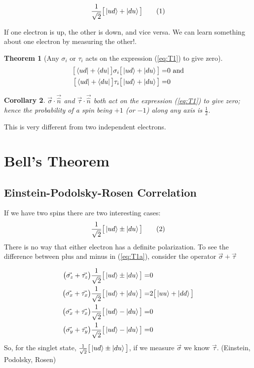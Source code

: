 \documentclass[]{article}
\newcommand\numberthis{\addtocounter{equation}{1}\tag{\theequation}}
\newtheorem{thm}{Theorem}
\newtheorem{cor}[thm]{Corollary}
\begin{document}
\begin{align*}
	\frac{1}{\sqrt{2}}\big[\ket{ud}+\ket{du}\big] \numberthis \label{eq:T1}
\end{align*}

If one electron is up, the other is down, and vice versa. We can learn something about one electron by measuring the other!.

\begin{thm}[Any $\sigma_i$ or $\tau_i$ acts on the expression (\ref{eq:T1}) to give zero]
	\begin{align*}
		\big[\bra{ud}+\bra{du}\big]\sigma_i\big[\ket{ud}+\ket{du}\big]=&0 \text{ and}\\
		\big[\bra{ud}+\bra{du}\big]\tau_i\big[\ket{ud}+\ket{du}\big]=&0
	\end{align*}
\end{thm}

\begin{cor}
	$\vec{\sigma}\cdot\vec{\hat{n}}$ and $\vec{\tau}\cdot\vec{\hat{n}}$ both  act on the expression (\ref{eq:T1}) to give zero; hence the probability of a spin being $+1$ (or $-1$) along any axis is $\frac{1}{2}$.
\end{cor}

This is very different from two independent electrons.

\section{Bell's Theorem}

\subsection{Einstein-Podolsky-Rosen Correlation}

If we have two spins there are two interesting cases:
\begin{align*}
	\frac{1}{\sqrt{2}}\big[\ket{ud}\pm\ket{du}\big] \numberthis \label{eq:T1a}
\end{align*}
There is no way that either electron has a definite polarization. To see the difference between plus and minus in (\ref{eq:T1a}), consider the operator $\vec{\sigma} + \vec{\tau}$

\begin{align*}
\big(\vec{\sigma_z} + \vec{\tau_z}\big)\frac{1}{\sqrt{2}}\big[\ket{ud}\pm\ket{du}\big]=& 0\\
\big(\vec{\sigma_x} + \vec{\tau_x}\big)\frac{1}{\sqrt{2}}\big[\ket{ud}+\ket{du}\big]=& 2 \big[\ket{uu}+\ket{dd}\big]\\
\big(\vec{\sigma_x} + \vec{\tau_x}\big)\frac{1}{\sqrt{2}}\big[\ket{ud}-\ket{du}\big]=& 0\\
\big(\vec{\sigma_y} + \vec{\tau_y}\big)\frac{1}{\sqrt{2}}\big[\ket{ud}-\ket{du}\big]=& 0
\end{align*}
So, for the singlet state, $\frac{1}{\sqrt{2}}\big[\ket{ud}\pm\ket{du}\big]$, if we measure $\vec{\sigma}$ we know $\vec{\tau}$. (Einstein, Podolsky, Rosen)\cite{einstein1935can}
\end{document}
